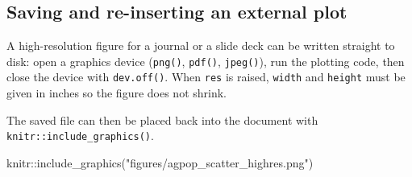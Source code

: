 \documentclass[
  letterpaper,
  DIV=11,
  numbers=noendperiod]{scrreprt}
\newenvironment{Shaded}{\begin{snugshade}}{\end{snugshade}}
\newcommand{\AttributeTok}[1]{\textcolor[rgb]{0.40,0.45,0.13}{#1}}
\newcommand{\ConstantTok}[1]{\textcolor[rgb]{0.56,0.35,0.01}{#1}}
\newcommand{\DecValTok}[1]{\textcolor[rgb]{0.68,0.00,0.00}{#1}}
\newcommand{\FunctionTok}[1]{\textcolor[rgb]{0.28,0.35,0.67}{#1}}
\newcommand{\NormalTok}[1]{\textcolor[rgb]{0.00,0.23,0.31}{#1}}
\newcommand{\SpecialCharTok}[1]{\textcolor[rgb]{0.37,0.37,0.37}{#1}}
\newcommand{\StringTok}[1]{\textcolor[rgb]{0.13,0.47,0.30}{#1}}
\renewcommand{\[}{\begin{equation}}
\renewcommand{\]}{\end{equation}}
\begin{document}
\subsection{Saving and re-inserting an external
plot}\label{saving-and-re-inserting-an-external-plot}

A high-resolution figure for a journal or a slide deck can be written
straight to disk: open a graphics device (\texttt{png()},
\texttt{pdf()}, \texttt{jpeg()}), run the plotting code, then close the
device with \texttt{dev.off()}. When \texttt{res} is raised,
\texttt{width} and \texttt{height} must be given in inches so the figure
does not shrink.

\begin{Shaded}
\end{Shaded}

The saved file can then be placed back into the document with
\texttt{knitr::include\_graphics()}.

\begin{Shaded}
\begin{Highlighting}[]
\NormalTok{knitr}\SpecialCharTok{::}\FunctionTok{include\_graphics}\NormalTok{(}\StringTok{"figures/agpop\_scatter\_highres.png"}\NormalTok{)}
\end{Highlighting}
\end{Shaded}
\end{document}
